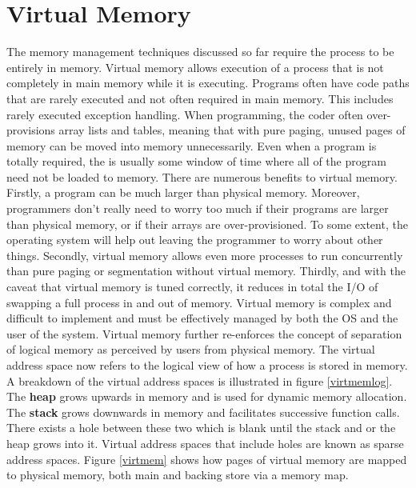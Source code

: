 \documentclass[10pt,a4paper]{article}
\begin{document}
\section{Virtual Memory}
The memory management techniques discussed so far require the process to be entirely in memory. Virtual memory allows execution of a process that is not completely in main memory while it is executing. Programs often have code paths that are rarely executed and not often required in main memory. This includes rarely executed exception handling. When programming, the coder often over-provisions array lists and tables, meaning that with pure paging, unused pages of memory can be moved into memory unnecessarily. Even when a program is totally required, the is usually some window of time where all of the program need not be loaded to memory.
\newline\newline
There are numerous benefits to virtual memory. Firstly, a program can be much larger than physical memory. Moreover, programmers don't really need to worry too much if their programs are larger than physical memory, or if their arrays are over-provisioned. To some extent, the operating system will help out leaving the programmer to worry about other things. Secondly, virtual memory allows even more processes to run concurrently than pure paging or segmentation without virtual memory. Thirdly, and with the caveat that virtual memory is tuned correctly, it reduces in total the I/O of swapping a full process in and out of memory. Virtual memory is complex and difficult to implement and must be effectively managed by both the OS and the user of the system. 
\newline\newline
Virtual memory further re-enforces the concept of separation of logical memory as perceived by users from physical memory. The virtual address space now refers to the logical view of how a process is stored in memory. A breakdown of the virtual address spaces is illustrated in figure \ref{virtmemlog}. The {\bf heap} grows upwards in memory and is used for dynamic memory allocation. The {\bf stack} grows downwards in memory and facilitates successive function calls. There exists a hole between these two which is blank until the stack and or the heap grows into it. Virtual address spaces that include holes are known as sparse address spaces. Figure \ref{virtmem} shows how pages of virtual memory are mapped to physical memory, both main and backing store via a memory map.
\end{document}

